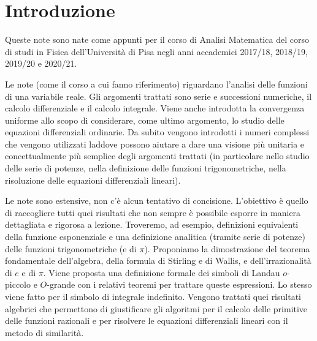 \chapter*{Introduzione}


Queste note sono nate come appunti per il corso di Analisi Matematica %
del corso di studi in Fisica dell'Università %
di Pisa negli anni accademici 2017/18, 2018/19, 2019/20 e 2020/21. %

Le note (come il corso a cui fanno riferimento) %
riguardano l'analisi delle funzioni di una variabile %
reale. %
Gli argomenti trattati sono serie e successioni numeriche, %
il calcolo differenziale e il calcolo integrale. %
Viene anche introdotta la convergenza uniforme allo scopo di considerare, %
come ultimo argomento, lo studio delle equazioni differenziali ordinarie. %
Da subito vengono introdotti i numeri complessi che vengono utilizzati %
laddove possono aiutare a dare una visione più unitaria e concettualmente %
più semplice degli argomenti trattati (in particolare nello studio delle serie %
di potenze, nella definizione delle funzioni trigonometriche, nella risoluzione delle equazioni differenziali lineari). %

Le note sono estensive, non c'è alcun tentativo di concisione. %
L'obiettivo è quello di raccogliere tutti quei risultati che non sempre è %
possibile esporre in maniera dettagliata e rigorosa a lezione. %
Troveremo, ad esempio, %
definizioni equivalenti della funzione esponenziale e una definizione %
analitica (tramite serie di potenze) %
delle funzioni trigonometriche (e di $\pi$). %
Proponiamo la dimostrazione del teorema fondamentale dell'algebra, %
della formula di Stirling e di Wallis, %
e dell'irrazionalità di $e$ e di $\pi$. %
Viene proposta una definizione formale dei simboli di Landau %
$o$-piccolo e $O$-grande con i relativi teoremi per trattare queste espressioni. %
Lo stesso viene fatto per il simbolo di integrale indefinito. %
Vengono trattati quei risultati algebrici che permettono di %
giustificare gli algoritmi per il calcolo delle primitive %
delle funzioni razionali e per risolvere le equazioni differenziali %
lineari con il metodo di similarità. %

